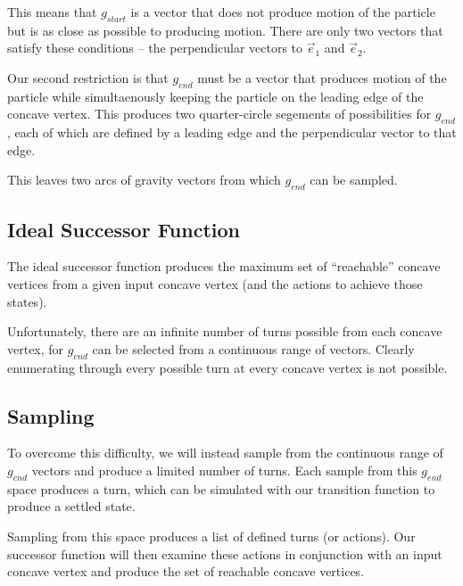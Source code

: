 This means that $g_{start}$ is a vector that does not produce motion of the particle but is as close as possible to producing motion. There are only two vectors that satisfy these conditions -- the perpendicular vectors to $\vec{e}_1$ and $\vec{e}_2$.


Our second restriction is that $g_{end}$ must be a vector that produces motion of the particle while simultaenously keeping the particle on the leading edge of the concave vertex. This produces two quarter-circle segements of possibilities for $g_{end}$, each of which are defined by a leading edge and the perpendicular vector to that edge.



This leaves two arcs of gravity vectors from which $g_{end}$ can be sampled.

	\subsection{Ideal Successor Function}

The ideal successor function produces the maximum set of ``reachable'' concave vertices from a given input concave vertex (and the actions to achieve those states).

Unfortunately, there are an infinite number of turns possible from each concave vertex, for $g_{end}$ can be selected from a continuous range of vectors. Clearly enumerating through every possible turn at every concave vertex is not possible.

	\subsection{Sampling}

To overcome this difficulty, we will instead sample from the continuous range of $g_{end}$ vectors and produce a limited number of turns. Each sample from this $g_{end}$ space produces a turn, which can be simulated with our transition function to produce a settled state.

Sampling from this space produces a list of defined turns (or actions). Our successor function will then examine these actions in conjunction with an input concave vertex and produce the set of reachable concave vertices.

